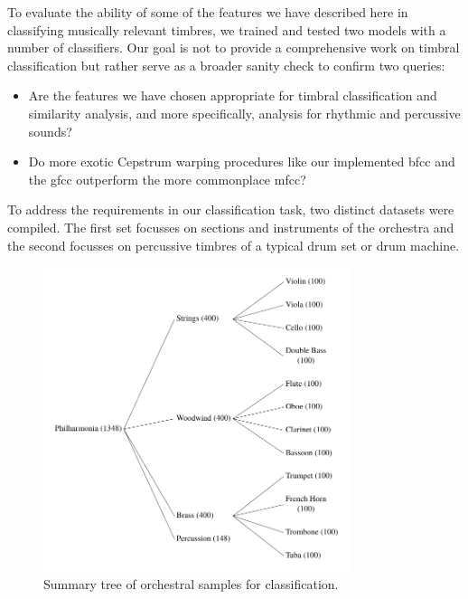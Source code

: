 {{{{To evaluate the ability of some of the features we have described here in classifying musically relevant timbres, we trained and tested two models with a number of classifiers. Our goal is not to provide a comprehensive work on timbral classification but rather serve as a broader sanity check to confirm two queries:

\begin{itemize}
  \item Are the features we have chosen appropriate for timbral classification and similarity analysis, and more specifically, analysis for rhythmic and percussive sounds?
  \item Do more exotic Cepstrum warping procedures like our implemented \acrshort{bfcc} and the \acrshort{gfcc} outperform the more commonplace \acrshort{mfcc}?
\end{itemize}

To address the requirements in our classification task, two distinct datasets were compiled. The first set focusses on sections and instruments of the orchestra and the second focusses on percussive timbres of a typical drum set or drum machine.

\begin{figure}
	\begin{center}
		\includegraphics[width=0.8\textwidth]{ch05_pyconcat/figures/orch_distribution.pdf}
	\end{center}
	\caption[Summary tree of orchestral samples for classification]{Summary tree of orchestral samples for classification.}
	\label{fig:orch_distribution}
\end{figure}

}}}}
